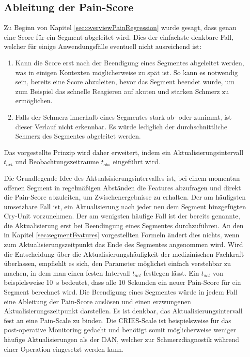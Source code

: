 \subsection{Ableitung der Pain-Score}
\label{sec:regressionPainScore}

Zu Beginn von Kapitel \ref{sec:overviewPainRegression} wurde gesagt, dass genau eine Score für ein Segment abgeleitet wird. Dies der einfachste denkbare Fall, welcher für einige Anwendungsfälle eventuell nicht ausreichend ist: 
\begin{enumerate}
\item Kann die Score erst nach der Beendigung eines Segmentes abgeleitet werden, was in einigen Kontexten möglicherweise zu spät ist. So kann es notwendig sein, bereits eine Score abzuleiten, bevor das Segment beendet wurde, um zum Beispiel das schnelle Reagieren auf akuten und starken Schmerz zu ermöglichen.
\item Falls der Schmerz innerhalb eines Segmentes stark ab- oder zunimmt, ist dieser Verlauf nicht erkennbar. Es würde lediglich der \glqq durchschnittliche Schmerz\grqq{} des Segmentes abgeleitet werden.
\end{enumerate}

Das vorgestellte Prinzip wird daher erweitert, indem ein Aktualisierungsintervall $t_{act}$ und Beobachtungszeitraume $t_{obs}$ eingeführt wird.

 Die Grundlegende Idee des Aktualsisierungsintervalles ist, bei einem momentan offenen Segment in regelmäßigen Abständen die Features abzufragen und direkt die Pain-Score abzuleiten, um Zwischenergebnisse zu erhalten. Der am häufigsten umsetzbare Fall ist, ein Aktualisierung nach jeder neu dem Segment hinzgefügten Cry-Unit vorzunehmen. Der am wenigsten häufige Fall ist der bereits genannte, die Aktualisierung erst bei Beendingung eines Segmentes durchzuführen. An den in Kapitel \ref{sec:segmentFeatures} vorgestellten Formeln ändert dies nichts, wenn zum Aktualisierungszeitpunkt das Ende des Segmentes angenommen wird. Wird die Entscheidung über die Aktualisierungshäufigkeit der medizinischen Fachkraft überlassen, empfiehlt es sich, den Parameter möglichst einfach verstehbar zu machen, in dem man einen festen Intervall $t_{act}$ festlegen lässt. Ein $t_{act}$ von beispielsweise \SI{10}{\second} bedeutet, dass alle 10 Sekunden ein neuer Pain-Score für ein Segment berechnet wird. Die Beendigung eines Segmentes würde in jedem Fall eine Ableitung der Pain-Score auslösen und einen \glqq erzwungenen Aktualisierungszeitpunkt\grqq{} darstellen. Es ist denkbar, das Aktualisierungsintervall fest an eine Pain-Scale zu binden. Die CRIES-Scale ist beispielsweise für das post-operative Monitoring gedacht und benötigt somit möglicherweise weniger häufige Aktualisierungen als der DAN, welcher zur Schmerzdiagnostik während einer Operation eingesetzt werden kann. \cite[S. 98]{painInNeonates}

